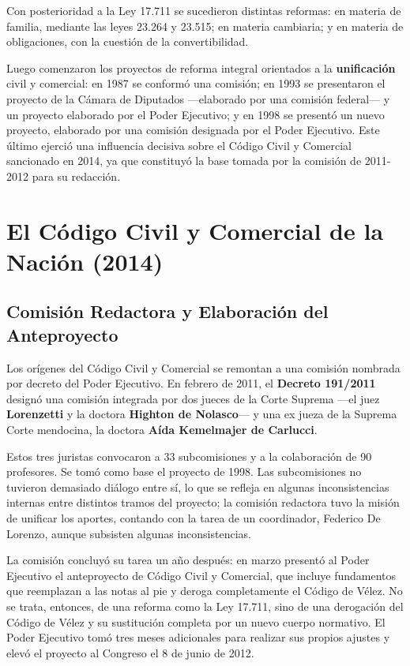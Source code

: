 \documentclass[12pt,oneside]{book}
\begin{document}
Con posterioridad a la Ley 17.711 se sucedieron distintas reformas: en materia de familia, mediante las leyes 23.264 y 23.515; en materia cambiaria; y en materia de obligaciones, con la cuestión de la convertibilidad.

Luego comenzaron los proyectos de reforma integral orientados a la \textbf{unificación} civil y comercial: en 1987 se conformó una comisión; en 1993 se presentaron el proyecto de la Cámara de Diputados —elaborado por una comisión federal— y un proyecto elaborado por el Poder Ejecutivo; y en 1998 se presentó un nuevo proyecto, elaborado por una comisión designada por el Poder Ejecutivo. Este último ejerció una influencia decisiva sobre el Código Civil y Comercial sancionado en 2014, ya que constituyó la base tomada por la comisión de 2011-2012 para su redacción.


\chapter{El Código Civil y Comercial de la Nación (2014)}

\section{Comisión Redactora y Elaboración del Anteproyecto}

Los orígenes del Código Civil y Comercial se remontan a una comisión nombrada por decreto del Poder Ejecutivo. En febrero de 2011, el \textbf{Decreto 191/2011} designó una comisión integrada por dos jueces de la Corte Suprema —el juez \textbf{Lorenzetti} y la doctora \textbf{Highton de Nolasco}— y una ex jueza de la Suprema Corte mendocina, la doctora \textbf{Aída Kemelmajer de Carlucci}.

Estos tres juristas convocaron a 33 subcomisiones y a la colaboración de 90 profesores. Se tomó como base el proyecto de 1998. Las subcomisiones no tuvieron demasiado diálogo entre sí, lo que se refleja en algunas inconsistencias internas entre distintos tramos del proyecto; la comisión redactora tuvo la misión de unificar los aportes, contando con la tarea de un coordinador, Federico De Lorenzo, aunque subsisten algunas inconsistencias.

La comisión concluyó su tarea un año después: en marzo presentó al Poder Ejecutivo el anteproyecto de Código Civil y Comercial, que incluye fundamentos que reemplazan a las notas al pie y deroga completamente el Código de Vélez. No se trata, entonces, de una reforma como la Ley 17.711, sino de una derogación del Código de Vélez y su sustitución completa por un nuevo cuerpo normativo. El Poder Ejecutivo tomó tres meses adicionales para realizar sus propios ajustes y elevó el proyecto al Congreso el 8 de junio de 2012.
\end{document}
